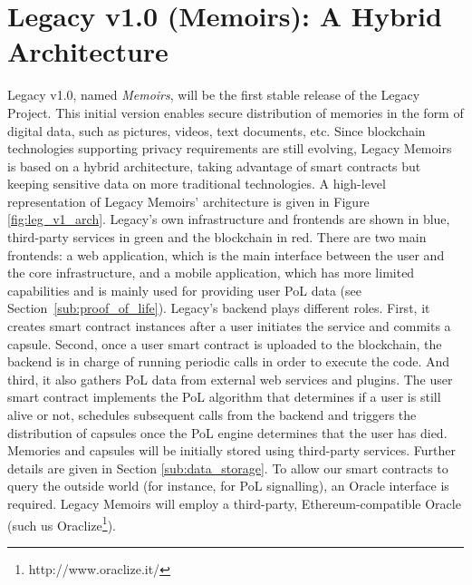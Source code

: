 \section{Legacy v1.0 (Memoirs): A Hybrid Architecture} %
\label{sec:legacy_v1_0_memoirs_a_hybrid_architecture}
Legacy v1.0, named \textit{Memoirs}, will be the first stable release of the Legacy Project. This initial version enables secure distribution of memories in the form of digital data, such as pictures, videos, text documents, etc. Since blockchain technologies supporting privacy requirements are still evolving, Legacy Memoirs is based on a hybrid architecture, taking advantage of smart contracts but keeping sensitive data on more traditional technologies.
A high-level representation of Legacy Memoirs’ architecture is given in Figure \ref{fig:leg_v1_arch}. Legacy’s own infrastructure and frontends are shown in blue, third-party services in green and the blockchain in red. There are two main frontends: a web application, which is the main interface between the user and the core infrastructure, and a mobile application, which has more limited capabilities and is mainly used for providing user PoL data (see Section~\ref{sub:proof_of_life}). Legacy’s backend plays different roles. First, it creates smart contract instances after a user initiates the service and commits a capsule. Second, once a user smart contract is uploaded to the blockchain, the backend is in charge of running periodic calls in order to execute the code. And third, it also gathers PoL data from external web services and plugins. The user smart contract implements the PoL algorithm that determines if a user is still alive or not, schedules subsequent calls from the backend and triggers the distribution of capsules once the PoL engine determines that the user has died. 
Memories and capsules will be initially stored using third-party services. Further details are given in Section \ref{sub:data_storage}.
To allow our smart contracts to query the outside world (for instance, for PoL signalling), an Oracle interface is required. Legacy Memoirs will employ a third-party, Ethereum-compatible Oracle (such us Oraclize\footnote{http://www.oraclize.it/}).

